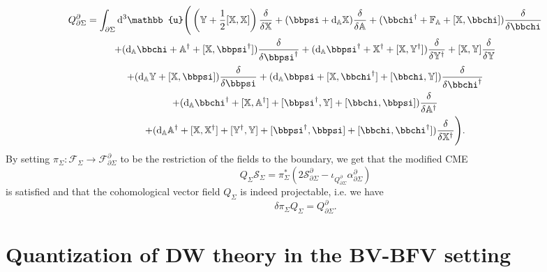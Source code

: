 \documentclass[11pt,colorinlistoftodos]{amsart}
\numberwithin{equation}{subsection}
\theoremstyle{plain}
\theoremstyle{definition}
\theoremstyle{remark}
\newcommand{\dd}{{\mathrm{d}}}
\newcommand{\de}{\partial}
\newcommand{\calS}{\mathcal{S}}
\newcommand{\calF}{\mathcal{F}}
\begin{document}
\begin{multline}
    Q^\de_{\de\Sigma}=\int_{\de\Sigma}\dd^3\mathbb{u}\Bigg(\left(\mathbb{Y}+\frac{1}{2}[\mathbb{X},\mathbb{X}]\right)\frac{\delta}{\delta \mathbb{X}}+(\bbpsi+\dd_\mathbb{A}\mathbb{X})\frac{\delta}{\delta \mathbb{A}}+(\bbchi^\dagger+\mathbb{F}_\mathbb{A}+[\mathbb{X},\bbchi])\frac{\delta}{\delta \bbchi}\\
    +(\dd_\mathbb{A}\bbchi+\mathbb{A}^\dagger+[\mathbb{X},\bbpsi^\dagger])\frac{\delta}{\delta \bbpsi^\dagger}+(\dd_\mathbb{A}\bbpsi^\dagger+\mathbb{X}^\dagger+[\mathbb{X},\mathbb{Y}^\dagger])\frac{\delta}{\delta \mathbb{Y}^\dagger}+[\mathbb{X},\mathbb{Y}]\frac{\delta}{\delta \mathbb{Y}}\\
    +(\dd_\mathbb{A}\mathbb{Y}+[\mathbb{X},\bbpsi])\frac{\delta}{\delta \bbpsi}+(\dd_\mathbb{A}\bbpsi+[\mathbb{X},\bbchi^\dagger]+[\bbchi,\mathbb{Y}])\frac{\delta}{\delta \bbchi^\dagger}\\
    +(\dd_\mathbb{A}\bbchi^\dagger+[\mathbb{X},\mathbb{A}^\dagger]+[\bbpsi^\dagger,\mathbb{Y}]+[\bbchi,\bbpsi])\frac{\delta}{\delta \mathbb{A}^\dagger}\\
    +(\dd_\mathbb{A}\mathbb{A}^\dagger+[\mathbb{X},\mathbb{X}^\dagger]+[\mathbb{Y}^\dagger,\mathbb{Y}]+[\bbpsi^\dagger,\bbpsi]+[\bbchi,\bbchi^\dagger])\frac{\delta}{\delta \mathbb{X}^\dagger}\Bigg).
\end{multline}
By setting $\pi_\Sigma\colon \calF_\Sigma\to \calF^\de_{\de\Sigma}$ to be the restriction of the fields to the boundary, we get that the modified CME 
\[
Q_\Sigma\calS_\Sigma=\pi^*_\Sigma(2\calS^\de_{\de\Sigma}-\iota_{Q^\de_{\de\Sigma}}\alpha^\de_{\de\Sigma})
\]
is satisfied and that the cohomological vector field $Q_\Sigma$ is indeed projectable, i.e. we have  
\[
\delta\pi_\Sigma Q_\Sigma=Q^\de_{\de\Sigma}.
\]


\section{Quantization of DW theory in the BV-BFV setting}
\label{sec:quantization_of_DW_theory_in_the_BV-BFV_setting}
\end{document}
